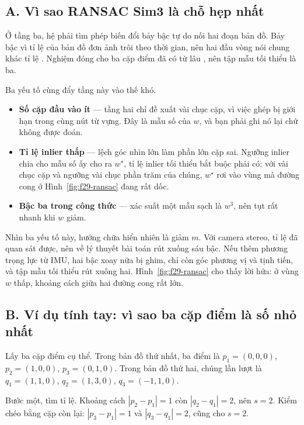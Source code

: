 \documentclass[../../deep_learning.tex]{subfiles}
\begin{document}
\subsection{A. Vì sao RANSAC Sim3 là chỗ hẹp nhất}
Ở tầng ba, hệ phải tìm phép biến đổi bảy bậc tự do nối hai đoạn bản đồ. Bảy bậc vì tỉ lệ của bản đồ đơn ảnh trôi theo thời gian, nên hai đầu vòng nói chung khác tỉ lệ \cite{f29strasdat2010scale}. Nghiệm đóng cho ba cặp điểm đã có từ lâu \cite{f29horn1987closed,f29umeyama1991least}, nên tập mẫu tối thiểu là ba.

Ba yếu tố cùng đẩy tầng này vào thế khó.

\begin{itemize}
\item \textbf{Số cặp đầu vào ít} --- tầng hai chỉ đề xuất vài chục cặp, vì việc ghép bị giới hạn trong cùng nút từ vựng. Đây là mẫu số của \(w\), và bạn phải ghi nó lại chứ không được đoán.
\item \textbf{Tỉ lệ inlier thấp} --- lệch góc nhìn lớn làm phần lớn cặp sai. Ngưỡng inlier chia cho mẫu số ấy cho ra \(w^\star\), tỉ lệ inlier tối thiểu bắt buộc phải có; với vài chục cặp và ngưỡng vài chục phần trăm của chúng, \(w^\star\) rơi vào vùng mà đường cong ở Hình~\ref{fig:f29-ransac} đang rất dốc.
\item \textbf{Bậc ba trong công thức} --- xác suất một mẫu sạch là \(w^3\), nên tụt rất nhanh khi \(w\) giảm.
\end{itemize}

Nhìn ba yếu tố này, hướng chữa hiển nhiên là giảm \(m\). Với camera stereo, tỉ lệ đã quan sát được, nên về lý thuyết bài toán rút xuống sáu bậc. Nếu thêm phương trọng lực từ IMU, hai bậc xoay nữa bị ghim, chỉ còn góc phương vị và tịnh tiến, và tập mẫu tối thiểu rút xuống hai. Hình~\ref{fig:f29-ransac} cho thấy lời hứa: ở vùng \(w\) thấp, khoảng cách giữa hai đường cong rất lớn.

\subsection{B. Ví dụ tính tay: vì sao ba cặp điểm là số nhỏ nhất}
Lấy ba cặp điểm cụ thể. Trong bản đồ thứ nhất, ba điểm là \(p_1=(0,0,0)\), \(p_2=(1,0,0)\), \(p_3=(0,1,0)\). Trong bản đồ thứ hai, chúng lần lượt là \(q_1=(1,1,0)\), \(q_2=(1,3,0)\), \(q_3=(-1,1,0)\).

Bước một, tìm tỉ lệ. Khoảng cách \(|p_2-p_1|=1\) còn \(|q_2-q_1|=2\), nên \(s=2\). Kiểm chéo bằng cặp còn lại: \(|p_3-p_1|=1\) và \(|q_3-q_1|=2\), cũng cho \(s=2\).
\end{document}
